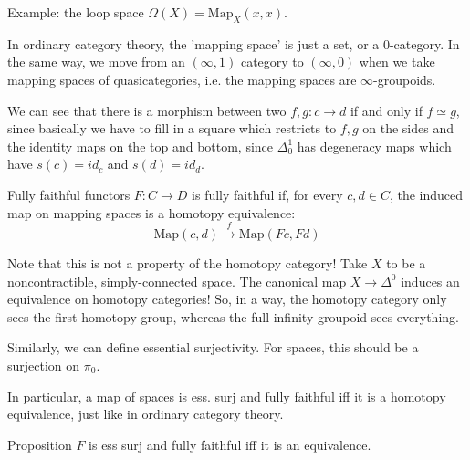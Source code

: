 Example: the loop space $\Omega(X)=\mathrm{Map}_X(x,x)$. 

In ordinary category theory, the 'mapping space' is just a set, or a $0$-category. In the same way, we move from an $(\infty,1)$ category to $(\infty, 0)$ when we take mapping spaces of quasicategories, i.e. the mapping spaces are $\infty$-groupoids.

We can see that there is a morphism between two $f,g:c\rightarrow d$ if and only if $f\simeq g$, since basically we have to fill in a square which restricts to $f,g$ on the sides and the identity maps on the top and bottom, since $\Delta^1_0$ has degeneracy maps which have $s(c)=id_c$ and $s(d)=id_d$.

\begin{definition}{Fully faithful functors}{}
    $F:C\rightarrow D$ is fully faithful if, for every $c,d\in C$, the induced map on mapping spaces is a homotopy equivalence: $$\mathrm{Map}(c,d)\xrightarrow{f} \mathrm{Map}(Fc,Fd)$$ 
\end{definition}


Note that this is not a property of the homotopy category! Take $X$ to be a noncontractible, simply-connected space. The canonical map $X\rightarrow \Delta^0$ induces an equivalence on homotopy categories! So, in a way, the homotopy category only sees the first homotopy group, whereas the full infinity groupoid sees everything.

Similarly, we can define essential surjectivity. For spaces, this should be a surjection on $\pi_0$. 

In particular, a map of spaces is ess. surj and fully faithful iff it is a homotopy equivalence, just like in ordinary category theory.

\begin{proposition}{Proposition}{}
    $F$ is ess surj and fully faithful iff it is an equivalence.
\end{proposition}


